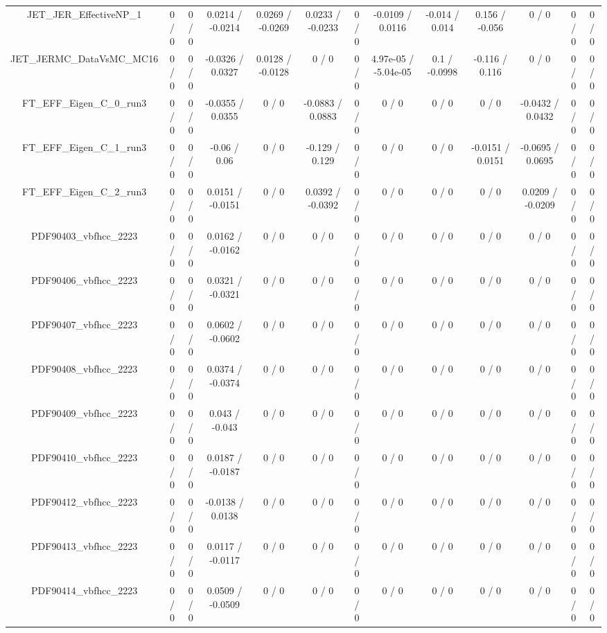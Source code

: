 \documentclass[10pt]{article}
\begin{document}
\begin{table}[htbp]
\begin{center}
\begin{tabular}{|c|c|c|c|c|c|c|c|c|c|c|c|c|}
  JET_JER_EffectiveNP_1 & 0 / 0 & 0 / 0 & 0.0214 / -0.0214 & 0.0269 / -0.0269 & 0.0233 / -0.0233 & 0 / 0 & -0.0109 / 0.0116 & -0.014 / 0.014 & 0.156 / -0.056 & 0 / 0 & 0 / 0 & 0 / 0 \\ 
  JET_JERMC_DataVsMC_MC16 & 0 / 0 & 0 / 0 & -0.0326 / 0.0327 & 0.0128 / -0.0128 & 0 / 0 & 0 / 0 & 4.97e-05 / -5.04e-05 & 0.1 / -0.0998 & -0.116 / 0.116 & 0 / 0 & 0 / 0 & 0 / 0 \\ 
  FT_EFF_Eigen_C_0_run3 & 0 / 0 & 0 / 0 & -0.0355 / 0.0355 & 0 / 0 & -0.0883 / 0.0883 & 0 / 0 & 0 / 0 & 0 / 0 & 0 / 0 & -0.0432 / 0.0432 & 0 / 0 & 0 / 0 \\ 
  FT_EFF_Eigen_C_1_run3 & 0 / 0 & 0 / 0 & -0.06 / 0.06 & 0 / 0 & -0.129 / 0.129 & 0 / 0 & 0 / 0 & 0 / 0 & -0.0151 / 0.0151 & -0.0695 / 0.0695 & 0 / 0 & 0 / 0 \\ 
  FT_EFF_Eigen_C_2_run3 & 0 / 0 & 0 / 0 & 0.0151 / -0.0151 & 0 / 0 & 0.0392 / -0.0392 & 0 / 0 & 0 / 0 & 0 / 0 & 0 / 0 & 0.0209 / -0.0209 & 0 / 0 & 0 / 0 \\ 
  PDF90403_vbfhcc_2223 & 0 / 0 & 0 / 0 & 0.0162 / -0.0162 & 0 / 0 & 0 / 0 & 0 / 0 & 0 / 0 & 0 / 0 & 0 / 0 & 0 / 0 & 0 / 0 & 0 / 0 \\ 
  PDF90406_vbfhcc_2223 & 0 / 0 & 0 / 0 & 0.0321 / -0.0321 & 0 / 0 & 0 / 0 & 0 / 0 & 0 / 0 & 0 / 0 & 0 / 0 & 0 / 0 & 0 / 0 & 0 / 0 \\ 
  PDF90407_vbfhcc_2223 & 0 / 0 & 0 / 0 & 0.0602 / -0.0602 & 0 / 0 & 0 / 0 & 0 / 0 & 0 / 0 & 0 / 0 & 0 / 0 & 0 / 0 & 0 / 0 & 0 / 0 \\ 
  PDF90408_vbfhcc_2223 & 0 / 0 & 0 / 0 & 0.0374 / -0.0374 & 0 / 0 & 0 / 0 & 0 / 0 & 0 / 0 & 0 / 0 & 0 / 0 & 0 / 0 & 0 / 0 & 0 / 0 \\ 
  PDF90409_vbfhcc_2223 & 0 / 0 & 0 / 0 & 0.043 / -0.043 & 0 / 0 & 0 / 0 & 0 / 0 & 0 / 0 & 0 / 0 & 0 / 0 & 0 / 0 & 0 / 0 & 0 / 0 \\ 
  PDF90410_vbfhcc_2223 & 0 / 0 & 0 / 0 & 0.0187 / -0.0187 & 0 / 0 & 0 / 0 & 0 / 0 & 0 / 0 & 0 / 0 & 0 / 0 & 0 / 0 & 0 / 0 & 0 / 0 \\ 
  PDF90412_vbfhcc_2223 & 0 / 0 & 0 / 0 & -0.0138 / 0.0138 & 0 / 0 & 0 / 0 & 0 / 0 & 0 / 0 & 0 / 0 & 0 / 0 & 0 / 0 & 0 / 0 & 0 / 0 \\ 
  PDF90413_vbfhcc_2223 & 0 / 0 & 0 / 0 & 0.0117 / -0.0117 & 0 / 0 & 0 / 0 & 0 / 0 & 0 / 0 & 0 / 0 & 0 / 0 & 0 / 0 & 0 / 0 & 0 / 0 \\ 
  PDF90414_vbfhcc_2223 & 0 / 0 & 0 / 0 & 0.0509 / -0.0509 & 0 / 0 & 0 / 0 & 0 / 0 & 0 / 0 & 0 / 0 & 0 / 0 & 0 / 0 & 0 / 0 & 0 / 0 \\ 

\end{tabular}
\end{center}
\end{table}
\end{document}
